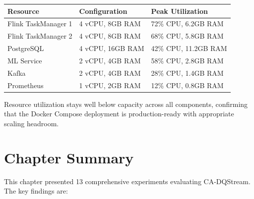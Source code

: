 \begin{longtable}{|m{4cm}|m{4cm}|m{4cm}|}
\hline
\textbf{Resource} & \textbf{Configuration} & \textbf{Peak Utilization} \\ \hline
Flink TaskManager 1 & 4 vCPU, 8GB RAM & 72\% CPU, 6.2GB RAM \\ \hline
Flink TaskManager 2 & 4 vCPU, 8GB RAM & 68\% CPU, 5.8GB RAM \\ \hline
PostgreSQL & 4 vCPU, 16GB RAM & 42\% CPU, 11.2GB RAM \\ \hline
ML Service & 2 vCPU, 4GB RAM & 58\% CPU, 2.8GB RAM \\ \hline
Kafka & 2 vCPU, 4GB RAM & 28\% CPU, 1.4GB RAM \\ \hline
Prometheus & 1 vCPU, 2GB RAM & 12\% CPU, 0.8GB RAM \\ \hline
\end{longtable}

Resource utilization stays well below capacity across all components, confirming that the Docker Compose deployment is production-ready with appropriate scaling headroom.

\section{Chapter Summary}

This chapter presented 13 comprehensive experiments evaluating CA-DQStream. The key findings are:

